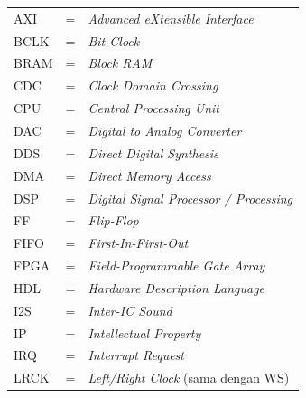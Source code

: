 \begin{center}
\end{center}

\begin{tabular}{llp{4in}}
    AXI   & \hspace{1cm} = & \textit{Advanced eXtensible Interface} \\
    BCLK  & \hspace{1cm} = & \textit{Bit Clock} \\
    BRAM  & \hspace{1cm} = & \textit{Block RAM} \\
    CDC   & \hspace{1cm} = & \textit{Clock Domain Crossing} \\
    CPU   & \hspace{1cm} = & \textit{Central Processing Unit} \\
    DAC   & \hspace{1cm} = & \textit{Digital to Analog Converter} \\
    DDS   & \hspace{1cm} = & \textit{Direct Digital Synthesis} \\
    DMA   & \hspace{1cm} = & \textit{Direct Memory Access} \\
    DSP   & \hspace{1cm} = & \textit{Digital Signal Processor / Processing} \\
    FF    & \hspace{1cm} = & \textit{Flip-Flop} \\
    FIFO  & \hspace{1cm} = & \textit{First-In-First-Out} \\
    FPGA  & \hspace{1cm} = & \textit{Field-Programmable Gate Array} \\
    HDL   & \hspace{1cm} = & \textit{Hardware Description Language} \\
    I2S   & \hspace{1cm} = & \textit{Inter-IC Sound} \\
    IP    & \hspace{1cm} = & \textit{Intellectual Property} \\
    IRQ   & \hspace{1cm} = & \textit{Interrupt Request} \\
    LRCK  & \hspace{1cm} = & \textit{Left/Right Clock} (sama dengan WS) \\

\end{tabular}
